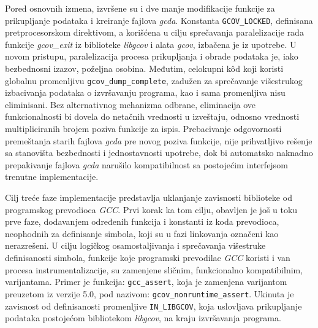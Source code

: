 \documentclass[12pt,oneside]{memoir}
\newcommand{\kod}[1]{\texttt{#1}}
\newcommand{\strano}[1]{\textit{#1}}
\begin{document}
Pored osnovnih izmena, izvršene su i dve manje modifikacije funkcije za prikupljanje podataka i kreiranje fajlova \strano{gcda}. Konstanta \kod{GCOV\_LOCKED}, definisana pretprocesorskom direktivom, a korišćena u cilju sprečavanja paralelizacije rada funkcije \strano{gcov\_exit} iz biblioteke \strano{libgcov} i alata \strano{gcov}, izbačena je iz upotrebe. U novom pristupu, paralelizacija procesa prikupljanja i obrade podataka je, iako bezbednosni izazov, poželjna osobina. Međutim, celokupni k\^{o}d koji koristi globalnu promenljivu \kod{gcov\_dump\_complete}, zadužen za sprečavanje višestrukog izbacivanja podataka o izvršavanju programa, kao i sama promenljiva nisu eliminisani. Bez alternativnog mehanizma odbrane, eliminacija ove funkcionalnosti bi dovela do netačnih vrednosti u izveštaju, odnosno vrednosti multipliciranih brojem poziva funkcije za ispis. Prebacivanje odgovornosti premeštanja starih fajlova \strano{gcda} pre novog poziva funkcije, nije prihvatljivo rešenje sa stanovišta bezbednosti i jednostavnosti upotrebe, dok bi automatsko naknadno prepakivanje fajlova \strano{gcda} narušilo kompatibilnost sa postojećim interfejsom trenutne implementacije. 

Cilj treće faze implementacije predstavlja uklanjanje zavisnosti biblioteke od programskog prevodioca \strano{GCC}. Prvi korak ka tom cilju, obavljen je još u toku prve faze, dodavanjem određenih funkcija i konstanti iz koda prevodioca, neophodnih za definisanje simbola, koji su u fazi linkovanja označeni kao nerazrešeni. U cilju logičkog osamostaljivanja i sprečavanja višestruke definisanosti simbola, funkcije koje programski prevodilac \strano{GCC} koristi i van procesa instrumentalizacije, su zamenjene sličnim, funkcionalno kompatibilnim, varijantama. Primer je funkcija: \kod{gcc\_assert}, koja je zamenjena varijantom preuzetom iz verzije 5.0, pod nazivom: \kod{gcov\_nonruntime\_assert}. Ukinuta je zavisnost od definisanosti promenljive \kod{IN\_LIBGCOV}, koja uslovljava prikupljanje podataka postojećom bibliotekom \strano{libgcov}, na kraju izvršavanja programa. 
\end{document}
